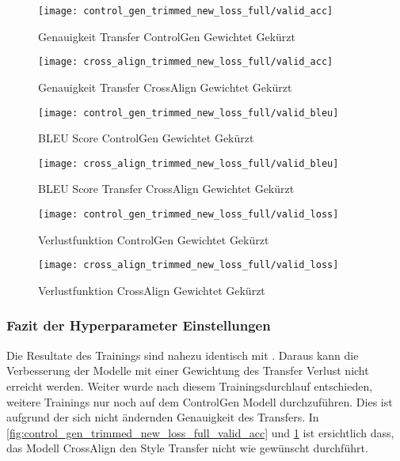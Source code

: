 \begin{figure}[H]
    \texttt{[image: control\_gen\_trimmed\_new\_loss\_full/valid\_acc]}
    \caption{Genauigkeit Transfer ControlGen Gewichtet \flqq Gekürzt\frqq}\label{fig:control_gen_trimmed_new_loss_full_valid_acc}
  \endminipage\hfill
    \texttt{[image: cross\_align\_trimmed\_new\_loss\_full/valid\_acc]}
    \caption{Genauigkeit Transfer CrossAlign Gewichtet \flqq Gekürzt\frqq}\label{fig:cross_align_trimmed_new_loss_full_valid_acc}
  \endminipage\hfill   
\end{figure}

\begin{figure}[H]
    \texttt{[image: control\_gen\_trimmed\_new\_loss\_full/valid\_bleu]}
    \caption{BLEU Score ControlGen Gewichtet \flqq Gekürzt\frqq}\label{fig:control_gen_trimmed_default_new_loss_valid_bleu}
  \endminipage\hfill
    \texttt{[image: cross\_align\_trimmed\_new\_loss\_full/valid\_bleu]}
    \caption{BLEU Score Transfer CrossAlign Gewichtet \flqq Gekürzt\frqq}\label{fig:cross_align_trimmed_new_loss_full_valid_bleu}
  \endminipage\hfill   
\end{figure}

\begin{figure}[H]
    \texttt{[image: control\_gen\_trimmed\_new\_loss\_full/valid\_loss]}
    \caption{Verlustfunktion ControlGen Gewichtet \flqq Gekürzt\frqq}\label{fig:control_gen_trimmed_new_loss_full_valid_loss}
  \endminipage\hfill
    \texttt{[image: cross\_align\_trimmed\_new\_loss\_full/valid\_loss]}
    \caption{Verlustfunktion CrossAlign Gewichtet \flqq Gekürzt\frqq}\label{fig:cross_align_trimmed_new_loss_full_valid_loss}
  \endminipage\hfill   
\end{figure}

\subsubsection{Fazit der Hyperparameter Einstellungen}
Die Resultate des Trainings  sind nahezu identisch mit
. Daraus kann die Verbesserung der Modelle mit einer Gewichtung des Transfer
Verlust nicht erreicht werden. Weiter wurde nach diesem Trainingsdurchlauf entschieden, weitere Trainings nur noch auf
dem ControlGen Modell durchzuführen. Dies ist aufgrund der sich nicht ändernden Genauigkeit des Transfers. In
\ref{fig:control_gen_trimmed_new_loss_full_valid_acc} und \ref{fig:cross_align_trimmed_new_loss_full_valid_acc} ist
ersichtlich dass, das Modell CrossAlign den Style Transfer nicht wie gewünscht durchführt. 

